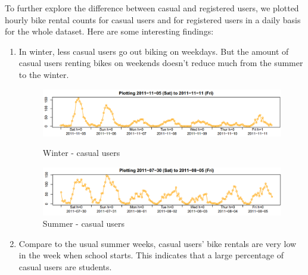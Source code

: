 \documentclass[12pt]{article}
\begin{document}
	To further explore the difference between casual and registered users, we plotted hourly bike rental counts for casual users and for registered users in a daily basis for the whole dataset. Here are some interesting findings:
	\begin{enumerate}
		\item In winter, less casual users go out biking on weekdays. But the amount of casual users renting bikes on weekends doesn't reduce much from the summer to the winter. 
	
		 \begin{figure}[H]
		 	\centering
		 	\begin{minipage}{.5\textwidth}
		 		\centering
		 		\includegraphics[width=\linewidth]{figures/casual_typical_winter.png}
		 		\caption{Winter - casual users}
		 	\end{minipage}%
		 	\begin{minipage}{.5\textwidth}
		 		\centering
		 		\includegraphics[width=\linewidth]{figures/casual_typical_summer.png}
		 		\caption{Summer - casual users}
		 	\end{minipage}
		 \end{figure}
	 \item Compare to the usual summer weeks, casual users' bike rentals are very low in the week when school starts. This indicates that a large percentage of casual users are students.
	 

\end{enumerate}
\end{document}
